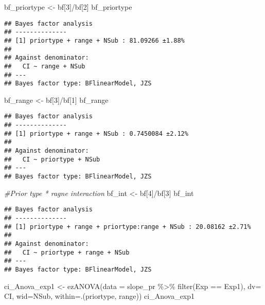 \documentclass[
]{article}
\newenvironment{Shaded}{\begin{snugshade}}{\end{snugshade}}
\newcommand{\AttributeTok}[1]{\textcolor[rgb]{0.77,0.63,0.00}{#1}}
\newcommand{\CommentTok}[1]{\textcolor[rgb]{0.56,0.35,0.01}{\textit{#1}}}
\newcommand{\DecValTok}[1]{\textcolor[rgb]{0.00,0.00,0.81}{#1}}
\newcommand{\FunctionTok}[1]{\textcolor[rgb]{0.00,0.00,0.00}{#1}}
\newcommand{\NormalTok}[1]{#1}
\newcommand{\OtherTok}[1]{\textcolor[rgb]{0.56,0.35,0.01}{#1}}
\newcommand{\SpecialCharTok}[1]{\textcolor[rgb]{0.00,0.00,0.00}{#1}}
\newcommand{\StringTok}[1]{\textcolor[rgb]{0.31,0.60,0.02}{#1}}
\begin{document}
\begin{Shaded}
\begin{Highlighting}[]
\NormalTok{ bf\_priortype }\OtherTok{\textless{}{-}}\NormalTok{ bf[}\DecValTok{3}\NormalTok{]}\SpecialCharTok{/}\NormalTok{bf[}\DecValTok{2}\NormalTok{]}
\NormalTok{ bf\_priortype}
\end{Highlighting}
\end{Shaded}

\begin{verbatim}
## Bayes factor analysis
## --------------
## [1] priortype + range + NSub : 81.09266 ±1.88%
## 
## Against denominator:
##   CI ~ range + NSub 
## ---
## Bayes factor type: BFlinearModel, JZS
\end{verbatim}

\begin{Shaded}
\begin{Highlighting}[]
\NormalTok{bf\_range }\OtherTok{\textless{}{-}}\NormalTok{ bf[}\DecValTok{3}\NormalTok{]}\SpecialCharTok{/}\NormalTok{bf[}\DecValTok{1}\NormalTok{]}
\NormalTok{bf\_range}
\end{Highlighting}
\end{Shaded}

\begin{verbatim}
## Bayes factor analysis
## --------------
## [1] priortype + range + NSub : 0.7450084 ±2.12%
## 
## Against denominator:
##   CI ~ priortype + NSub 
## ---
## Bayes factor type: BFlinearModel, JZS
\end{verbatim}

\begin{Shaded}
\begin{Highlighting}[]
\CommentTok{\#Prior type * ragne interaction }
\NormalTok{bf\_int }\OtherTok{\textless{}{-}}\NormalTok{ bf[}\DecValTok{4}\NormalTok{]}\SpecialCharTok{/}\NormalTok{bf[}\DecValTok{3}\NormalTok{] }
\NormalTok{bf\_int}
\end{Highlighting}
\end{Shaded}

\begin{verbatim}
## Bayes factor analysis
## --------------
## [1] priortype + range + priortype:range + NSub : 20.08162 ±2.71%
## 
## Against denominator:
##   CI ~ priortype + range + NSub 
## ---
## Bayes factor type: BFlinearModel, JZS
\end{verbatim}

\begin{Shaded}
\begin{Highlighting}[]
\NormalTok{ci\_Anova\_exp1 }\OtherTok{\textless{}{-}} \FunctionTok{ezANOVA}\NormalTok{(}\AttributeTok{data =}\NormalTok{ slope\_pr }\SpecialCharTok{\%\textgreater{}\%} \FunctionTok{filter}\NormalTok{(Exp }\SpecialCharTok{==} \StringTok{\textquotesingle{}Exp1\textquotesingle{}}\NormalTok{), }\AttributeTok{dv=}\NormalTok{ CI, }\AttributeTok{wid=}\NormalTok{NSub, }\AttributeTok{within=}\NormalTok{.(priortype, range))}
\NormalTok{ci\_Anova\_exp1}
\end{Highlighting}
\end{Shaded}
\end{document}
